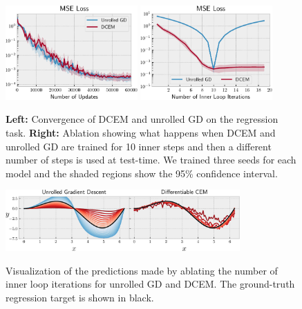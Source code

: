 \documentclass{article}
\begin{document}
\begin{figure}[t]
  \centering
  \includegraphics[width=0.45\textwidth]{regression/mse-loss.pdf}
  \includegraphics[width=0.45\textwidth]{regression/inner-iter-ablation.pdf}
  \caption{\textbf{Left:} Convergence of DCEM and unrolled GD on the
    regression task.
    \textbf{Right:} Ablation showing what happens when DCEM and unrolled GD are
    trained for 10 inner steps and then a different number of
    steps is used at test-time.
    We trained three seeds for each model and the shaded regions
    show the 95\% confidence interval.
  }
  \label{fig:reg:conv}
\end{figure}

\begin{figure}[t]
  \centering
  \includegraphics[width=0.8\textwidth]{regression/inner-iter-ablation-vis.pdf} \\
  \caption{
    Visualization of the predictions made by ablating the
    number of inner loop iterations for unrolled GD and DCEM.
    The ground-truth regression target is shown in black.
  }
  \label{fig:reg:pred-vis}
\end{figure}
\end{document}
